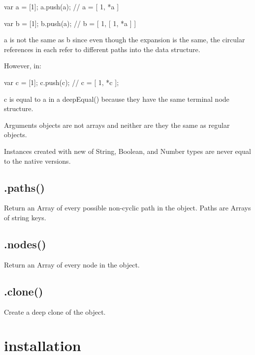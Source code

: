\begin{DoxyCode}
var a = [1];
a.push(a); // a = [ 1, *a ]

var b = [1];
b.push(a); // b = [ 1, [ 1, *a ] ]
\end{DoxyCode}


{\ttfamily a} is not the same as {\ttfamily b} since even though the expansion is the same, the circular references in each refer to different paths into the data structure.

However, in\+:


\begin{DoxyCode}
var c = [1];
c.push(c); // c = [ 1, *c ];
\end{DoxyCode}


{\ttfamily c} is equal to {\ttfamily a} in a {\ttfamily deep\+Equal()} because they have the same terminal node structure.


\begin{DoxyItemize}
\item Arguments objects are not arrays and neither are they the same as regular objects.
\item Instances created with {\ttfamily new} of String, Boolean, and Number types are never equal to the native versions.
\end{DoxyItemize}

\subsection*{.paths() }

Return an {\ttfamily Array} of every possible non-\/cyclic path in the object. Paths are {\ttfamily Array}s of string keys.

\subsection*{.nodes() }

Return an {\ttfamily Array} of every node in the object.

\subsection*{.clone() }

Create a deep clone of the object.

\section*{installation }

